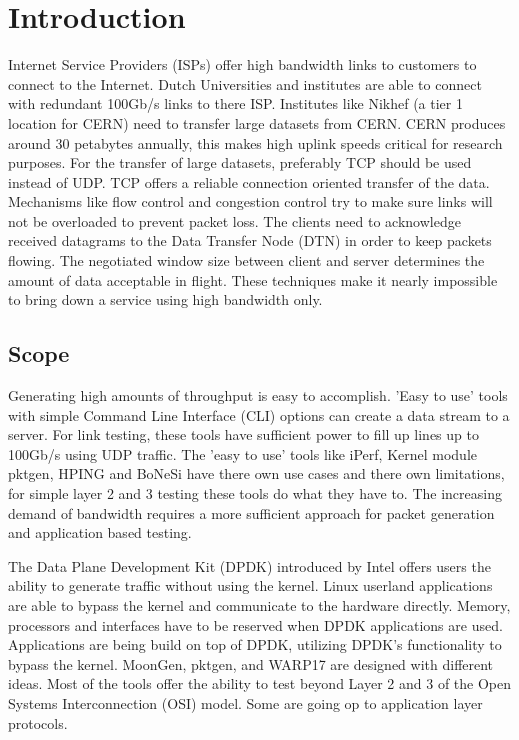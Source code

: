 \chapter{Introduction}\label{ch:intro}
Internet Service Providers (ISPs) offer high bandwidth links to customers to connect to the Internet. Dutch Universities and institutes are able to connect with redundant 100Gb/s links to there ISP.
Institutes like Nikhef (a tier 1 location for CERN) need to transfer large datasets from CERN. CERN produces around 30 petabytes annually\cite{cerndata}, this makes high uplink speeds critical for research purposes.
For the transfer of large datasets, preferably TCP should be used instead of UDP. TCP offers a reliable connection oriented transfer of the data. 
Mechanisms like flow control and congestion control try to make sure links will not be overloaded to prevent packet loss. The clients need to acknowledge received datagrams to the Data Transfer Node (DTN) in order to keep packets flowing. 
The negotiated window size between client and server determines the amount of data acceptable in flight.  
These techniques make it nearly impossible to bring down a service using high bandwidth only. 


\section{Scope}\label{sec:scope}

Generating high amounts of throughput is easy to accomplish. 'Easy to use' tools with simple Command Line Interface (CLI) options can create a data stream to a server. For link testing, these tools have sufficient power to fill up lines up to 100Gb/s using UDP traffic. 
The 'easy to use' tools like iPerf\cite{iperf}, Kernel module pktgen\cite{pktgen-kernel}, HPING\cite{hping} and BoNeSi\cite{bonesi} have there own use cases and there own limitations, for simple layer 2 and 3 testing these tools do what they have to.
The increasing demand of bandwidth requires a more sufficient approach for packet generation and application based testing. 

The Data Plane Development Kit\cite{dpdk} (DPDK) introduced by Intel offers users the ability to generate traffic without using the kernel.  
Linux userland applications are able to bypass the kernel and communicate to the hardware directly. Memory, processors and interfaces have to be reserved when DPDK applications are used.
Applications are being build on top of DPDK, utilizing DPDK's functionality to bypass the kernel. MoonGen\cite{moongen}, pktgen\cite{pktgen-dpdk}, and WARP17\cite{warp} are designed with different ideas. Most of the tools offer the ability to test beyond Layer 2 and 3 of the Open Systems Interconnection (OSI) model.
Some are going op to application layer protocols.\\ 

